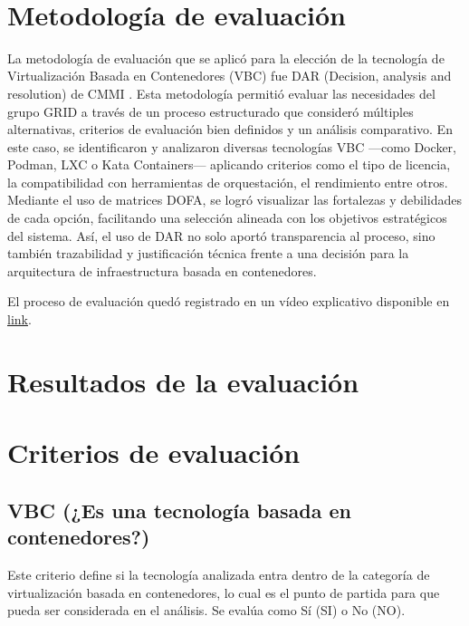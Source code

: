\label{cap:dar}
\mbox{}\\
\section{Metodología de evaluación}

La metodología de evaluación que se aplicó para la elección de la tecnología de Virtualización Basada en Contenedores (VBC) fue DAR (Decision, analysis and resolution) de CMMI \citep{CMMIInstitute2010}. Esta metodología permitió evaluar las necesidades del grupo GRID a través de un proceso estructurado que consideró múltiples alternativas, criterios de evaluación bien definidos y un análisis comparativo. En este caso, se identificaron y analizaron diversas tecnologías VBC —como Docker, Podman, LXC o Kata Containers— aplicando criterios como el tipo de licencia, la compatibilidad con herramientas de orquestación, el rendimiento entre otros. Mediante el uso de matrices DOFA, se logró visualizar las fortalezas y debilidades de cada opción, facilitando una selección alineada con los objetivos estratégicos del sistema. Así, el uso de DAR no solo aportó transparencia al proceso, sino también trazabilidad y justificación técnica frente a una decisión para la arquitectura de infraestructura basada en contenedores.

El proceso de evaluación quedó registrado en un vídeo explicativo disponible en \href{https://youtu.be/xOmuQs2RX2c}{link}.

\section{Resultados de la evaluación}



\section{Criterios de evaluación}

\subsection{VBC (¿Es una tecnología basada en contenedores?)}
Este criterio define si la tecnología analizada entra dentro de la categoría de virtualización basada en contenedores, lo cual es el punto de partida para que pueda ser considerada en el análisis. Se evalúa como Sí (SI) o No (NO).

